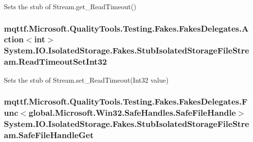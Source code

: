 Sets the stub of Stream.\-get\-\_\-\-Read\-Timeout()

\hypertarget{class_system_1_1_i_o_1_1_isolated_storage_1_1_fakes_1_1_stub_isolated_storage_file_stream_a8fc33b6a36340e91ad4248aeb70a1fad}{
\subsubsection[{Read\-Timeout\-Set\-Int32}]{\setlength{\rightskip}{0pt plus 5cm}mqttf.\-Microsoft.\-Quality\-Tools.\-Testing.\-Fakes.\-Fakes\-Delegates.\-Action$<$int$>$ System.\-I\-O.\-Isolated\-Storage.\-Fakes.\-Stub\-Isolated\-Storage\-File\-Stream.\-Read\-Timeout\-Set\-Int32}}\label{class_system_1_1_i_o_1_1_isolated_storage_1_1_fakes_1_1_stub_isolated_storage_file_stream_a8fc33b6a36340e91ad4248aeb70a1fad}


Sets the stub of Stream.\-set\-\_\-\-Read\-Timeout(\-Int32 value)

\hypertarget{class_system_1_1_i_o_1_1_isolated_storage_1_1_fakes_1_1_stub_isolated_storage_file_stream_abf84a6a0d016b8adba63183cb6145c79}{
\subsubsection[{Safe\-File\-Handle\-Get}]{\setlength{\rightskip}{0pt plus 5cm}mqttf.\-Microsoft.\-Quality\-Tools.\-Testing.\-Fakes.\-Fakes\-Delegates.\-Func$<$global.\-Microsoft.\-Win32.\-Safe\-Handles.\-Safe\-File\-Handle$>$ System.\-I\-O.\-Isolated\-Storage.\-Fakes.\-Stub\-Isolated\-Storage\-File\-Stream.\-Safe\-File\-Handle\-Get}}\label{class_system_1_1_i_o_1_1_isolated_storage_1_1_fakes_1_1_stub_isolated_storage_file_stream_abf84a6a0d016b8adba63183cb6145c79}


